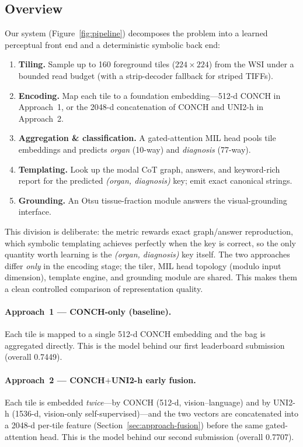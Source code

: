\documentclass[11pt,a4paper]{article}
\begin{document}
\subsection{Overview}
Our system (Figure~\ref{fig:pipeline}) decomposes the problem into a learned perceptual front
end and a deterministic symbolic back end:
\begin{enumerate}[leftmargin=1.4em,itemsep=2pt]
  \item \textbf{Tiling.} Sample up to 160 foreground tiles ($224{\times}224$) from the WSI under
        a bounded read budget (with a strip-decoder fallback for striped TIFFs).
  \item \textbf{Encoding.} Map each tile to a foundation embedding---512-d CONCH in
        Approach~1, or the 2048-d concatenation of CONCH and UNI2-h in Approach~2.
  \item \textbf{Aggregation \& classification.} A gated-attention MIL head pools tile
        embeddings and predicts \emph{organ} (10-way) and \emph{diagnosis} (77-way).
  \item \textbf{Templating.} Look up the modal CoT graph, answers, and keyword-rich report for
        the predicted \emph{(organ, diagnosis)} key; emit exact canonical strings.
  \item \textbf{Grounding.} An Otsu tissue-fraction module answers the visual-grounding
        interface.
\end{enumerate}
This division is deliberate: the metric rewards exact graph/answer reproduction, which symbolic
templating achieves perfectly when the key is correct, so the only quantity worth learning is
the \emph{(organ, diagnosis)} key itself. The two approaches differ \emph{only} in the encoding
stage; the tiler, MIL head topology (modulo input dimension), template engine, and grounding
module are shared. This makes them a clean controlled comparison of representation quality.

\paragraph{Approach~1 --- CONCH-only (baseline).}
Each tile is mapped to a single 512-d CONCH embedding and the bag is aggregated directly. This is
the model behind our first leaderboard submission (overall 0.7449).

\paragraph{Approach~2 --- CONCH$+$UNI2-h early fusion.}
Each tile is embedded \emph{twice}---by CONCH (512-d, vision--language) and by UNI2-h (1536-d,
vision-only self-supervised)---and the two vectors are concatenated into a 2048-d per-tile feature
(Section~\ref{sec:approach-fusion}) before the same gated-attention head. This is the model behind
our second submission (overall 0.7707).
\end{document}
